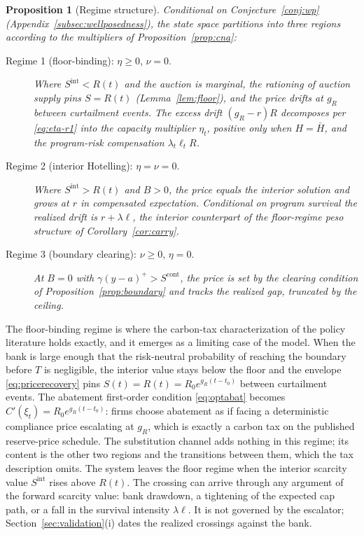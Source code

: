 \documentclass[11pt,letterpaper]{article}
\theoremstyle{plain}
\newtheorem{proposition}[theorem]{Proposition}
\theoremstyle{definition}
\numberwithin{equation}{section}
\begin{document}
\begin{proposition}[Regime structure]\label{prop:regimes}
Conditional on Conjecture~\ref{conj:wp} (Appendix~\ref{subsec:wellposedness}), the state space partitions into three regions according to the multipliers of Proposition~\ref{prop:cna}:
\begin{description}
\item[Regime 1 (floor-binding): $\eta\geq0$, $\nu=0$.] Where $S^{\mathrm{int}}<R(t)$ and the auction is marginal, the rationing of auction supply pins $S=R(t)$ (Lemma~\ref{lem:floor}), and the price drifts at $g_R$ between curtailment events. The excess drift $(g_R-r)R$ decomposes per \eqref{eq:eta-r1} into the capacity multiplier $\eta_t$, positive only when $H=\bar H$, and the program-risk compensation $\lambda_t\ell_tR$.
\item[Regime 2 (interior Hotelling): $\eta=\nu=0$.] Where $S^{\mathrm{int}}>R(t)$ and $B>0$, the price equals the interior solution and grows at $r$ in compensated expectation. Conditional on program survival the realized drift is $r+\lambda\ell$, the interior counterpart of the floor-regime peso structure of Corollary~\ref{cor:carry}.
\item[Regime 3 (boundary clearing): $\nu\ge 0$, $\eta=0$.] At $B=0$ with $\gamma(y-a)^{+}>S^{\mathrm{cont}}$, the price is set by the clearing condition of Proposition~\ref{prop:boundary} and tracks the realized gap, truncated by the ceiling.
\end{description}
\end{proposition}

The floor-binding regime is where the carbon-tax characterization of the policy literature holds exactly, and it emerges as a limiting case of the model. When the bank is large enough that the risk-neutral probability of reaching the boundary before $T$ is negligible, the interior value stays below the floor and the envelope \eqref{eq:pricerecovery} pins $S(t)=R(t)=R_0e^{g_R(t-t_0)}$ between curtailment events. The abatement first-order condition \eqref{eq:optabat} becomes $C'(\xi_t)=R_0e^{g_R(t-t_0)}$: firms choose abatement as if facing a deterministic compliance price escalating at $g_R$, which is exactly a carbon tax on the published reserve-price schedule. The substitution channel adds nothing in this regime; its content is the other two regions and the transitions between them, which the tax description omits. The system leaves the floor regime when the interior scarcity value $S^{\mathrm{int}}$ rises above $R(t)$. The crossing can arrive through any argument of the forward scarcity value: bank drawdown, a tightening of the expected cap path, or a fall in the survival intensity $\lambda\ell$. It is not governed by the escalator; Section~\ref{sec:validation}(i) dates the realized crossings against the bank.
\end{document}

